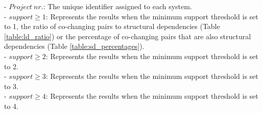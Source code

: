 \hspace{-4em}- \textit{$Project\ nr.$}: The unique identifier assigned to each system. \\
- \textit{$support\geq 1$}: Represents the results when the minimum support threshold is set to 1, the ratio of co-changing pairs to structural dependencies (Table \ref{table:ld_ratio}) or the percentage of co-changing pairs that are also structural dependencies (Table \ref{table:sd_percentages}). \\
- \textit{$support\geq 2$}: Represents the results when the minimum support threshold is set to 2. \\
- \textit{$support\geq 3$}: Represents the results when the minimum support threshold is set to 3. \\
- \textit{$support\geq 4$}: Represents the results when the minimum support threshold is set to 4.


